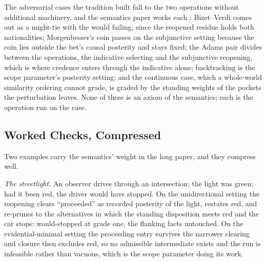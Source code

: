 \documentclass[11pt]{article}
\theoremstyle{definition}
\begin{document}
The adversarial cases the tradition built fall to the two operations without additional machinery, and the semantics paper works each \cite{AethusSemantics}: Bizet--Verdi comes out as a might-tie with the would failing, since the reopened residue holds both nationalities; Morgenbesser's coin passes on the subjunctive setting because the coin lies outside the bet's causal posterity and stays fixed; the Adams pair divides between the operations, the indicative selecting and the subjunctive reopening, which is where credence enters through the indicative alone; backtracking is the scope parameter's posterity setting; and the continuous case, which a whole-world similarity ordering cannot grade, is graded by the standing weights of the pockets the perturbation leaves. None of these is an axiom of the semantics; each is the operation run on the case.

\subsection{Worked Checks, Compressed}\label{sec:checks}

Two examples carry the semantics' weight in the long paper, and they compress well.

\emph{The streetlight.} An observer drives through an intersection; the light was green; had it been red, the driver would have stopped. On the unidirectional setting the reopening clears ``proceeded'' as recorded posterity of the light, restates red, and re-prunes to the alternatives in which the standing disposition meets red and the car stops: would-stopped at grade one, the flanking facts untouched. On the evidential-minimal setting the proceeding entry survives the narrower clearing and closure then excludes red, so no admissible intermediate exists and the run is infeasible rather than vacuous, which is the scope parameter doing its work.
\end{document}
